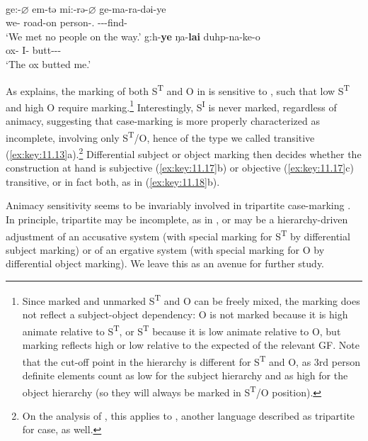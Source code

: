 \documentclass[output=paper]{langsci/langscibook}
\begin{document}
\ea%
    \label{ex:key:11.18} \\
	\ea
		\gll ge:-\textbf{${\varnothing}$}    em-tə    mi:-rə-\textbf{${\varnothing}$}      ge-ma-ra-dəi-ye\\
			we-\Nom{}  road-on  person-\Pl.\Abs{} \Fpl-\Neg-\Tpl{}-find-\Ipfv{}\\
		\glt ‘We met no people on the way.’
	\ex
		\gll g:h-\textbf{ye}  ŋa-\textbf{lai}  duhp-na-ke-o\\
			ox-\Erg{}    I-\Acc{}  butt-\Fsg-\Pfv-\Tsg{}\\
		\glt ‘The ox butted me.’
	\z
\z

As \citet[69]{Watters2002} explains, the marking of both S\textsuperscript{T}
and O in  is sensitive to , such that low 
S\textsuperscript{T} and high  O require marking.\footnote{Since marked
and unmarked S\textsuperscript{T} and O can be freely mixed, the marking does
not reflect a subject-object dependency: O is not marked because it is high
animate relative to S\textsuperscript{T}, or S\textsuperscript{T} because it is
low animate relative to O, but marking reflects high or low  relative to
the expected  of the relevant \gls{GF}. Note that the cut-off point
in the  hierarchy is different for S\textsuperscript{T} and O, as 3rd
person definite elements count as low for the subject hierarchy and as high for
the object hierarchy (so they will always be marked in S\textsuperscript{T}/O
position).} Interestingly, S\textsuperscript{I} is never marked, regardless of
animacy, suggesting that  case-marking is more properly characterized
as incomplete, involving only S\textsuperscript{T}/O, hence of the type we
called transitive (\ref{ex:key:11.13}a).\footnote{On the analysis of
    \citet{Lindenbergh2015}, this applies to , another language
    described as tripartite for case, as well.} Differential subject or object
    marking then decides whether the construction at hand is subjective
    (\ref{ex:key:11.17}b) or objective (\ref{ex:key:11.17}c) transitive, or in
    fact both, as in (\ref{ex:key:11.18}b).

Animacy sensitivity seems to be invariably involved in tripartite case-marking
\citep{Zwart2006a}. In principle, tripartite  may be incomplete,
as in , or may be a hierarchy-driven adjustment of an accusative
system (with special marking for S\textsuperscript{T} by differential subject
marking) or of an ergative system (with special marking for O by differential
object marking).  We leave this as an avenue for further study.
\end{document}

